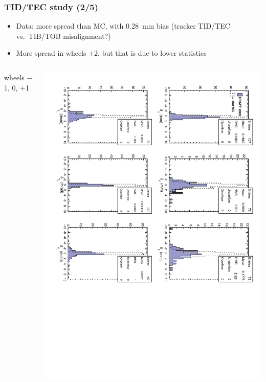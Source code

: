 \documentclass[compress]{beamer}
\begin{document}
\begin{frame}
\frametitle{TID/TEC study (2/5)}
\begin{itemize}
\item Data: more spread than MC, with 0.28~mm bias (tracker TID/TEC vs.\ TIB/TOB misalignment?)
\item More spread in wheels $\pm$2, but that is due to lower statistics
\end{itemize}

\begin{columns}
\begin{center}
wheels $-$1, 0, $+$1
\end{center}
\includegraphics[height=\linewidth, angle=90]{tecdiff_central.pdf}


\end{columns}
\end{frame}
\end{document}
